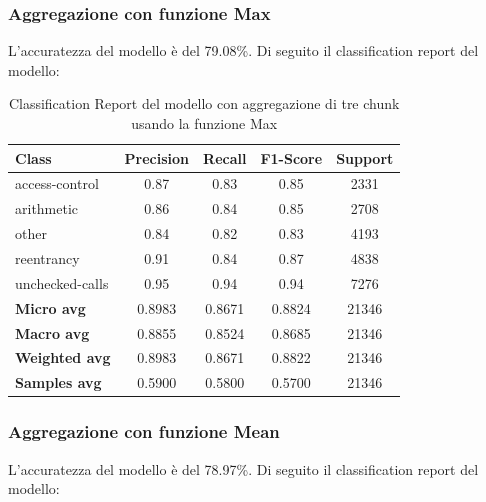 \documentclass[../../Thesis.tex]{subfiles}
\begin{document}
\subsubsection{Aggregazione con funzione Max}
L'accuratezza del modello è del 79.08\%. Di seguito il classification report del modello:
\begin{table}[H]
    \centering
    \small
    \begin{tabular}{lcccc}
    \hline
    \textbf{Class} & \textbf{Precision} & \textbf{Recall} & \textbf{F1-Score} & \textbf{Support} \\
    \hline
    access-control & 0.87 & 0.83 & 0.85 & 2331 \\
    arithmetic & 0.86 & 0.84 & 0.85 & 2708 \\
    other & 0.84 & 0.82 & 0.83 & 4193 \\
    reentrancy & 0.91 & 0.84 & 0.87 & 4838 \\
    unchecked-calls & 0.95 & 0.94 & 0.94 & 7276 \\
    \hline
    \textbf{Micro avg} & 0.8983 & 0.8671 & 0.8824 & 21346 \\
    \textbf{Macro avg} & 0.8855 & 0.8524 & 0.8685 & 21346 \\
    \textbf{Weighted avg} & 0.8983 & 0.8671 & 0.8822 & 21346 \\
    \textbf{Samples avg} & 0.5900 & 0.5800 & 0.5700 & 21346 \\
    \hline
    \end{tabular}
    \caption{Classification Report del modello con aggregazione di tre chunk usando la funzione Max}
    \end{table}
    

\subsubsection{Aggregazione con funzione Mean}
L'accuratezza del modello è del 78.97\%. Di seguito il classification report del modello:
\end{document}
